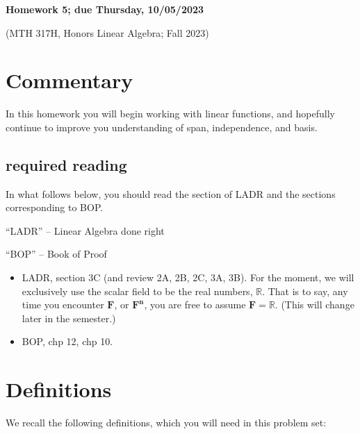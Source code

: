 \documentclass[12pt]{article}
\def\real{{\mathbb R}}
\begin{document}
	\begin{LARGE}
	\begin{center}
		
		

		
	
	\textbf{Homework 5; due Thursday, 10/05/2023}
	

	(MTH 317H, Honors Linear Algebra;  Fall 2023)
	\end{center}
	\end{LARGE}
	\vspace{0.15in}
	
	
	


	
\section{Commentary}

In this homework you will begin working with linear functions, and hopefully continue to improve you understanding of span, independence, and basis.



\subsection{required reading}



In what follows below, you should read the section of LADR and the sections corresponding to BOP.



\noindent
``LADR'' -- Linear Algebra done right


\noindent
``BOP'' -- Book of Proof

\begin{itemize}
	\item LADR, section 3C   (and review 2A, 2B, 2C, 3A, 3B).  For the moment, we will exclusively use the scalar field to be the real numbers, $\real$.  That is to say, any time you encounter $\mathbf{F}$, or $\mathbf{F^n}$, you are free to assume $\mathbf{F}=\real$.  (This will change later in the semester.)
	
	
	\item BOP, chp 12, chp 10. 
\end{itemize}


\section{Definitions}\label{defs}
We recall the following definitions, which you will need in this problem set: 
\end{document}

